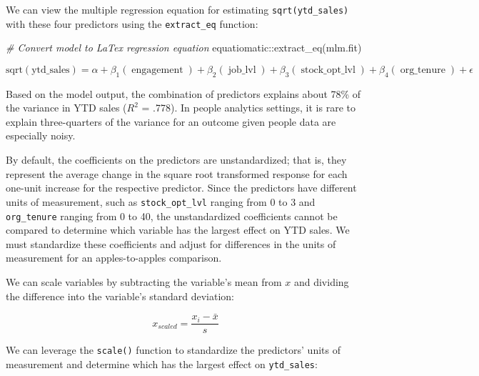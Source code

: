 \documentclass[
]{book}
\newenvironment{Shaded}{\begin{snugshade}}{\end{snugshade}}
\newcommand{\CommentTok}[1]{\textcolor[rgb]{0.56,0.35,0.01}{\textit{#1}}}
\newcommand{\FunctionTok}[1]{\textcolor[rgb]{0.00,0.00,0.00}{#1}}
\newcommand{\NormalTok}[1]{#1}
\newcommand{\SpecialCharTok}[1]{\textcolor[rgb]{0.00,0.00,0.00}{#1}}
\begin{document}
We can view the multiple regression equation for estimating \texttt{sqrt(ytd\_sales)} with these four predictors using the \texttt{extract\_eq} function:

\begin{Shaded}
\begin{Highlighting}[]
\CommentTok{\# Convert model to LaTex regression equation}
\NormalTok{equatiomatic}\SpecialCharTok{::}\FunctionTok{extract\_eq}\NormalTok{(mlm.fit)}
\end{Highlighting}
\end{Shaded}

\begin{equation}
\operatorname{sqrt(ytd\_sales)} = \alpha + \beta_{1}(\operatorname{engagement}) + \beta_{2}(\operatorname{job\_lvl}) + \beta_{3}(\operatorname{stock\_opt\_lvl}) + \beta_{4}(\operatorname{org\_tenure}) + \epsilon
\end{equation}

Based on the model output, the combination of predictors explains about 78\% of the variance in YTD sales (\(R^2\) = .778). In people analytics settings, it is rare to explain three-quarters of the variance for an outcome given people data are especially noisy.

By default, the coefficients on the predictors are unstandardized; that is, they represent the average change in the square root transformed response for each one-unit increase for the respective predictor. Since the predictors have different units of measurement, such as \texttt{stock\_opt\_lvl} ranging from 0 to 3 and \texttt{org\_tenure} ranging from 0 to 40, the unstandardized coefficients cannot be compared to determine which variable has the largest effect on YTD sales. We must standardize these coefficients and adjust for differences in the units of measurement for an apples-to-apples comparison.

We can scale variables by subtracting the variable's mean from \(x\) and dividing the difference into the variable's standard deviation:

\[ x_{scaled} = \frac{x_i - \bar{x}} {s} \]

We can leverage the \texttt{scale()} function to standardize the predictors' units of measurement and determine which has the largest effect on \texttt{ytd\_sales}:
\end{document}

